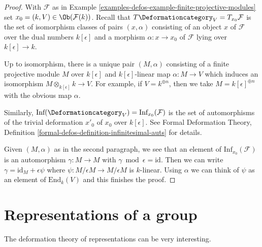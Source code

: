 \begin{proof}
With $\mathcal{F}$ as in Example \ref{examples-defos-example-finite-projective-modules}
set $x_0 = (k, V) \in \Ob(\mathcal{F}(k))$.
Recall that $T\Deformationcategory_V = T_{x_0}\mathcal{F}$
is the set of isomorphism
classes of pairs $(x, \alpha)$ consisting of an object $x$ of $\mathcal{F}
$ over the dual numbers $k[\epsilon]$ and a morphism
$\alpha : x \to x_0$ of $\mathcal{F}$ lying over $k[\epsilon] \to k$.

\medskip\noindent
Up to isomorphism, there is a unique pair $(M, \alpha)$ consisting of a
finite projective module $M$ over $k[\epsilon]$
and $k[\epsilon]$-linear map $\alpha : M \to V$
which induces an isomorphism $M \otimes_{k[\epsilon]} k \to V$.
For example, if $V = k^{\oplus n}$, then we take
$M = k[\epsilon]^{\oplus n}$ with the obvious map $\alpha$.

\medskip\noindent
Similarly, $\text{Inf}(\Deformationcategory_V) = \text{Inf}_{x_0}(\mathcal{F})$
is the set of automorphisms
of the trivial deformation $x'_0$ of $x_0$ over $k[\epsilon]$.
See Formal Deformation Theory, Definition
\ref{formal-defos-definition-infinitesimal-auts} for details.

\medskip\noindent
Given $(M, \alpha)$ as in the second paragraph, we see that an element of
$\text{Inf}_{x_0}(\mathcal{F})$ is an automorphism $\gamma : M \to M$ with
$\gamma \bmod \epsilon = \text{id}$. Then we can write
$\gamma = \text{id}_M + \epsilon \psi$ where
$\psi : M/\epsilon M \to M/\epsilon M$ is $k$-linear.
Using $\alpha$ we can think of $\psi$ as an element of
$\text{End}_k(V)$ and this finishes the proof.
\end{proof}

\section{Representations of a group}
\label{examples-defos-section-representations}
The deformation theory of representations can be very interesting.

